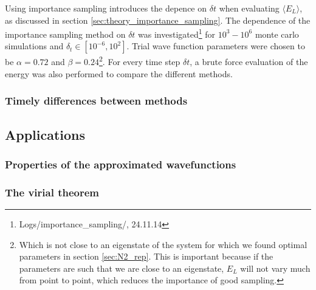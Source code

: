 Using importance sampling introduces the depence on $\delta t$ when evaluating $\langle E_L \rangle$, as discussed in section \ref{sec:theory_importance_sampling}.
The dependence of the importance sampling method on $\delta t$ was investigated\footnote{Logs/importance\_sampling/, 24.11.14} 
for $10^3 - 10^6$ monte carlo simulations and $\delta_t \in [10^{-6}, 10^2]$. 
Trial wave function parameters were chosen to be $\alpha = 0.72$ and $\beta = 0.24$\footnote{Which is not close to an eigenstate of the system for which we found optimal parameters in section \ref{sec:N2_rep}. This is important because if the parameters are such that we are close to an eigenstate, $E_L$ will not vary much from point to point, which reduces the importance of good sampling.}.
For every time step $\delta t$, a brute force evaluation of the energy was also performed to compare the different methods. 


\subsubsection{Timely differences between methods}



















\subsection{Applications}

\subsubsection{Properties of the approximated wavefunctions}

\subsubsection{The virial theorem }